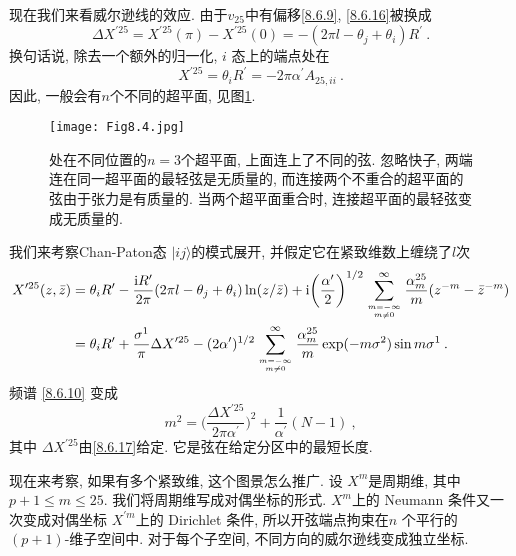 现在我们来看威尔逊线的效应. 由于$v_{25}$中有偏移\eqref{8.6.9}, \eqref{8.6.16}被换成
\begin{equation}
	\Delta X^{\prime 25}=X^{\prime 25}(\pi)-X^{\prime 25}(0)=-(2 \pi l-\theta_{j}+\theta_{i}) R^{\prime} \:. \label{8.6.17}
\end{equation}
换句话说, 除去一个额外的归一化,  $i$ 态上的端点处在
\begin{equation}
	X^{\prime 25}=\theta_{i} R^{\prime}=-2 \pi \alpha^{\prime} A_{25, i i} \:. \label{8.6.18}
\end{equation}
因此, 一般会有$n$个不同的超平面, 见图\ref{Fig8.4}.

\begin{figure}[h!]
	\begin{center}
		\texttt{[image: Fig8.4.jpg]}
		\caption{处在不同位置的$n=3$个超平面, 上面连上了不同的弦. 忽略快子, 两端连在同一超平面的最轻弦是无质量的, 而连接两个不重合的超平面的弦由于张力是有质量的. 当两个超平面重合时, 连接超平面的最轻弦变成无质量的.}\label{Fig8.4}
	\end{center}
\end{figure}

我们来考察Chan-Paton态 $|i j\rangle$的模式展开, 并假定它在紧致维数上缠绕了$l$次
\begin{align}
	X^{\prime 25}(z, \bar{z}) &= \theta_{i} R^{\prime} - \frac{\mathrm{i} R^{\prime}}{2 \pi}(2 \pi l-\theta_{j}+\theta_{i}) 
	\ln (z / \bar{z}) + \mathrm{i} \biggl(\frac{\alpha^{\prime}}{2}\biggr)^{1/2} 
	\sum_{m=-\infty \atop m \neq 0}^{\infty} \frac{\alpha_{m}^{25}}{m}(z^{-m}-\bar{z}^{-m})  \nonumber \\
	&=\theta_{i} R^{\prime} + \frac{\sigma^{1}}{\pi} \Delta X^{\prime 25} - (2 \alpha^{\prime})^{1/2} 
	\sum_{m=-\infty \atop m \neq 0}^{\infty} \frac{\alpha_{m}^{25}}{m} \exp (-m \sigma^{2}) \sin m \sigma^{1} \:. \label{8.6.19}
\end{align}
频谱 \eqref{8.6.10} 变成
\begin{equation}
	m^{2}=\biggl(\frac{\Delta X^{\prime 25}}{2 \pi \alpha^{\prime}}\biggr)^{2}+\frac{1}{\alpha^{\prime}}(N-1) \:, \label{8.6.20}
\end{equation}
其中 $\Delta X^{\prime 25}$由\eqref{8.6.17}给定. 它是弦在给定分区中的最短长度.

现在来考察, 如果有多个紧致维, 这个图景怎么推广. 设 $X^{m}$是周期维, 其中 $p+1 \leq m \leq 25$. 我们将周期维写成对偶坐标的形式. 
$X^{m}$上的 Neumann 条件又一次变成对偶坐标 $X^{\prime m}$上的 Dirichlet 条件, 所以开弦端点拘束在$n$ 个平行的$(p+1)$-维子空间中. 
对于每个子空间, 不同方向的威尔逊线变成独立坐标.

